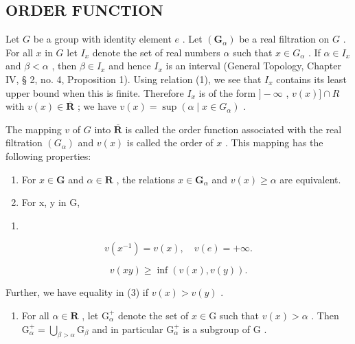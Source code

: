 \subsection{ORDER FUNCTION}

Let \(G\) be a group with identity element \(e\) . Let \((\mathbf{G}_{\alpha})\) be a real filtration on \(G\) . For all \(x\) in \(G\) let \(I_x\) denote the set of real numbers \(\alpha\) such that \(x \in G_{\alpha}\) . If \(\alpha \in I_x\) and \(\beta < \alpha\) , then \(\beta \in I_x\) and hence \(I_x\) is an interval (General Topology, Chapter IV, § 2, no. 4, Proposition 1). Using relation (1), we see that \(I_x\) contains its least upper bound when this is finite. Therefore \(I_x\) is of the form \(] - \infty\) , \(v(x)] \cap R\) with \(v(x) \in \overline{\mathbf{R}}\) ; we have \(v(x) = \sup(\alpha \mid x \in G_{\alpha})\) .

The mapping \(v\) of \(G\) into \(\overline{\mathbf{R}}\) is called the order function associated with the real filtration \((G_{\alpha})\) and \(v(x)\) is called the order of \(x\) . This mapping has the following properties:

\begin{enumerate}
\def\labelenumi{(\alph{enumi})}
\item
  For \(x \in \mathbf{G}\) and \(\alpha \in \mathbf{R}\) , the relations \(x \in \mathbf{G}_{\alpha}\) and \(v(x) \geqslant \alpha\) are equivalent.
\item
  For x, y in G,
\end{enumerate}

\begin{enumerate}
\def\labelenumi{(\arabic{enumi})}
\setcounter{enumi}{1}
\tightlist
\item
\end{enumerate}

\[
v (x ^ {- 1}) = v (x), \quad v (e) = + \infty .\tag{2}
\]

\[
v (x y) \geqslant \inf (v (x), v (y)).\tag{3}
\]

Further, we have equality in (3) if \(v(x) > v(y)\) .

\begin{enumerate}
\def\labelenumi{(\alph{enumi})}
\setcounter{enumi}{2}
\tightlist
\item
  For all \(\alpha \in \mathbf{R}\) , let \(\mathrm{G}_{\alpha}^{+}\) denote the set of \(x \in \mathrm{G}\) such that \(v(x) > \alpha\) . Then \(\mathrm{G}_{\alpha}^{+} = \bigcup_{\beta > \alpha} \mathrm{G}_{\beta}\) and in particular \(\mathrm{G}_{\alpha}^{+}\) is a subgroup of \(\mathrm{G}\) .
\end{enumerate}

